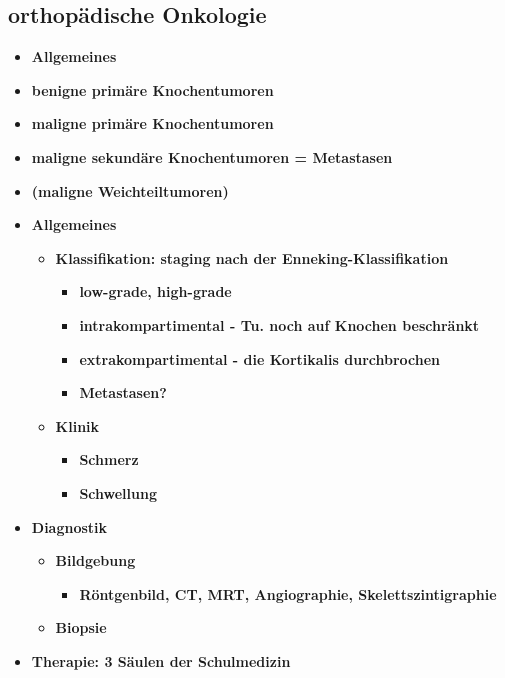 \subsection{orthopädische Onkologie}
	\begin{itemize}
		\item \textbf{Allgemeines}
		\item \textbf{benigne primäre Knochentumoren}
		\item \textbf{maligne primäre Knochentumoren}
		\item \textbf{maligne sekundäre Knochentumoren = Metastasen}
		\item \textbf{(maligne Weichteiltumoren)}
	\pagebreak
		\item \textbf{Allgemeines}
			\begin{itemize}
				\item \textbf{Klassifikation: staging nach der Enneking-Klassifikation}
					\begin{itemize}
						\item \textbf{low-grade, high-grade}
						\item \textbf{intrakompartimental - Tu. noch auf Knochen beschränkt}
						\item \textbf{extrakompartimental - die Kortikalis durchbrochen}
						\item \textbf{Metastasen?}
					\end{itemize}
				\item \textbf{Klinik}
					\begin{itemize}
						\item \textbf{Schmerz}
						\item \textbf{Schwellung}
					\end{itemize}
			\end{itemize}
		\item \textbf{Diagnostik}
			\begin{itemize}
				\item \textbf{Bildgebung}
					\begin{itemize}
						\item \textbf{Röntgenbild, CT, MRT, Angiographie, Skelettszintigraphie}
					\end{itemize}
				\item \textbf{Biopsie}
			\end{itemize}
		\item \textbf{Therapie: 3 Säulen der Schulmedizin}
 	\end{itemize}


